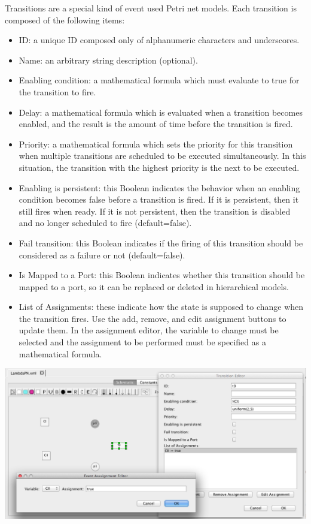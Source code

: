\documentclass[titlepage,11pt]{article}
\begin{document}
\noindent
Transitions are a special kind of event used Petri net models.  Each transition is composed of the following items:
\begin{itemize}
\item ID: a unique ID composed only of alphanumeric characters and underscores.
\item Name: an arbitrary string description (optional).
\item Enabling condition: a mathematical formula which must evaluate to true for the transition to fire.
\item Delay: a mathematical formula which is evaluated when a transition becomes enabled, and the result is the amount of time before the transition is fired.
\item Priority: a mathematical formula which sets the priority for this transition when multiple transitions are scheduled to be executed simultaneously.  In this situation, the transition with the highest priority is the next to be executed.
\item Enabling is persistent: this Boolean indicates the behavior when an enabling condition becomes false before a transition is fired.  If it is persistent, then it still fires when ready.  If it is not persistent, then the transition is disabled and no longer scheduled to fire (default=false).
\item Fail transition: this Boolean indicates if the firing of this transition should be considered as a failure or not (default=false).
\item Is Mapped to a Port: this Boolean indicates whether this transition should be mapped to a port, so it can be replaced or deleted in hierarchical models.
\item List of Assignments: these indicate how the state is supposed to change when the transition fires.  Use the add, remove, and edit assignment buttons to update them.  In the assignment editor, the variable to change must be selected and the assignment to be performed must be specified as a mathematical formula.
\end{itemize}

\begin{center}
\includegraphics[width=160mm]{screenshots/transition}
\end{center}
\end{document}
